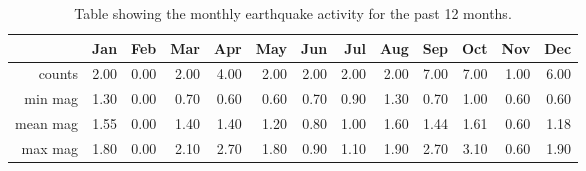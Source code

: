 \begin{table}[ht]
\centering
\begin{tabular}{rrrrrrrrrrrrr}
  \hline
 & Jan & Feb & Mar & Apr & May & Jun & Jul & Aug & Sep & Oct & Nov & Dec \\ 
  \hline
counts & 2.00 & 0.00 & 2.00 & 4.00 & 2.00 & 2.00 & 2.00 & 2.00 & 7.00 & 7.00 & 1.00 & 6.00 \\ 
  min mag & 1.30 & 0.00 & 0.70 & 0.60 & 0.60 & 0.70 & 0.90 & 1.30 & 0.70 & 1.00 & 0.60 & 0.60 \\ 
  mean mag & 1.55 & 0.00 & 1.40 & 1.40 & 1.20 & 0.80 & 1.00 & 1.60 & 1.44 & 1.61 & 0.60 & 1.18 \\ 
  max mag & 1.80 & 0.00 & 2.10 & 2.70 & 1.80 & 0.90 & 1.10 & 1.90 & 2.70 & 3.10 & 0.60 & 1.90 \\ 
   \hline
\end{tabular}
\caption{Table showing the monthly earthquake activity for the past
                       12 months.} 
\label{tab1}
\end{table}
